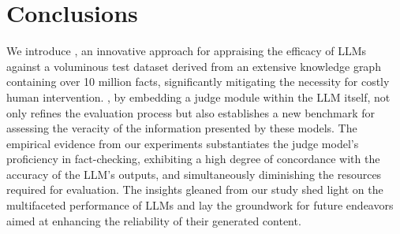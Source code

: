 \vspace{-0.3cm}
\section{Conclusions}
We introduce \GraphEval{}, an innovative approach for appraising the efficacy of LLMs against a voluminous test dataset derived from an extensive knowledge graph containing over 10 million facts, significantly mitigating the necessity for costly human intervention. \GraphEval{}, by embedding a judge module within the LLM itself, not only refines the evaluation process but also establishes a new benchmark for assessing the veracity of the information presented by these models. The empirical evidence from our experiments substantiates the judge model's proficiency in fact-checking, exhibiting a high degree of concordance with the accuracy of the LLM's outputs, and simultaneously diminishing the resources required for evaluation. The insights gleaned from our study shed light on the multifaceted performance of LLMs and lay the groundwork for future endeavors aimed at enhancing the reliability of their generated content. 




